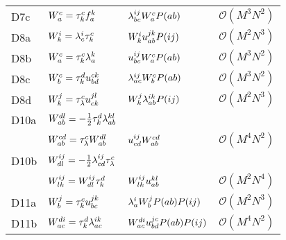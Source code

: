 \begin{center}
\begin{longtable}{@{}llll@{}}
                D7c
                & $W^{c}_{a} = \tau^{c}_{k} f^{k}_{a}$
                & $\lambda^{ij}_{bc} W^{c}_{a} P(ab)$
                & $\mathcal{O}(M^3 N^2)$
                \\

                D8a
                & $W^{i}_{k} = \lambda^{i}_{c} \tau^{c}_{k}$
                & $W^{i}_{k} u^{jk}_{ab} P(ij)$
                & $\mathcal{O}(M^2 N^3)$
                \\

                D8b
                & $W^{c}_{a} = \tau^{c}_{k} \lambda^{k}_{a}$
                & $u^{ij}_{bc} W^{c}_{a} P(ab)$
                & $\mathcal{O}(M^3 N^2)$
                \\

                D8c
                & $W^{c}_{b} = \tau^{d}_{k} u^{ck}_{bd}$
                & $\lambda^{ij}_{ac} W^{c}_{b} P(ab)$
                & $\mathcal{O}(M^3 N^2)$
                \\

                D8d
                & $W^{j}_{k} = \tau^{c}_{\lambda} u^{jl}_{ck}$
                & $W^{j}_{k} \lambda^{ik}_{ab} P(ij)$
                & $\mathcal{O}(M^2 N^3)$
                \\

                D10a
                & $W^{dl}_{ab} = -\frac{1}{2} \tau^{d}_{k} \lambda^{kl}_{ab}$
                \\
                & $W^{cd}_{ab} = \tau^{c}_{\lambda} W^{dl}_{ab}$
                & $u^{ij}_{cd} W^{cd}_{ab}$
                & $\mathcal{O}(M^4 N^2)$
                \\

                D10b
                & $W^{ij}_{dl} = -\frac{1}{2} \lambda^{ij}_{cd} \tau^{c}_{\lambda}$
                \\
                & $W^{ij}_{lk} = W^{ij}_{dl} \tau^{d}_{k}$
                & $W^{ij}_{lk} u^{kl}_{ab}$
                & $\mathcal{O}(M^2 N^4)$
                \\

                D11a
                & $W^{j}_{b} = \tau^{c}_{k} u^{jk}_{bc}$
                & $\lambda^{i}_{a} W^{j}_{b} P(ab) P(ij)$
                & $\mathcal{O}(M^2 N^3)$
                \\

                D11b
                & $W^{di}_{ac} = \tau^{d}_{k} \lambda^{ik}_{ac}$
                & $W^{di}_{ac} u^{jc}_{bd} P(ab) P(ij)$
                & $\mathcal{O}(M^4 N^2)$
                \\


\end{longtable}
\end{center}
